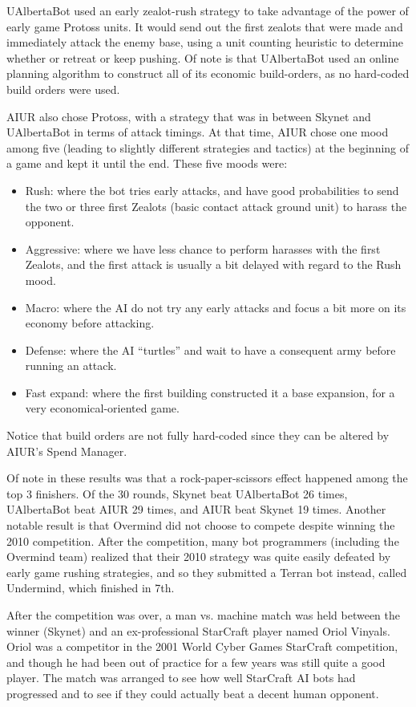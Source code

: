 \documentclass[journal]{IEEEtran}
\begin{document}
UAlbertaBot used an early zealot-rush strategy to take advantage of the power of early game Protoss units. 
It would send out the first zealots that were made and immediately attack the enemy base, using a unit
counting heuristic to determine whether or retreat or keep pushing. Of note is that UAlbertaBot used an
online planning algorithm to construct all of its economic build-orders\cite{churchill2011build}, as no hard-coded build orders
were used. 

AIUR also chose  Protoss, with a strategy that was in between Skynet
and UAlbertaBot in terms of  attack timings.  At that time, AIUR chose
one  mood among  five (leading  to slightly  different  strategies and
tactics) at the  beginning of a game and kept it  until the end. These
five moods were:
\begin{itemize}
\item  Rush:  where  the  bot  tries  early  attacks,  and  have  good
  probabilities to send the two or three first Zealots (basic contact attack ground unit) to harass the
  opponent.
\item Aggressive: where  we have less chance to  perform harasses with
  the first Zealots, and the first attack is usually a bit delayed
  with regard to the Rush mood.
\item Macro: where the AI do not try any early attacks and focus a bit
  more on its economy before attacking.
\item Defense: where the AI  ``turtles'' and wait to have a consequent
  army before running an attack.
\item  Fast expand:  where the  first building  constructed it  a base
  expansion, for a very economical-oriented game.
\end{itemize}
Notice that  build orders are not  fully hard-coded since  they can be
altered by AIUR's Spend Manager.

Of  note  in  these  results  was that  a  rock-paper-scissors  effect
happened among  the top  3 finishers.  Of  the 30 rounds,  Skynet beat
UAlbertaBot 26  times, UAlbertaBot beat  AIUR 29 times, and  AIUR beat
Skynet  19 times.   Another notable  result is  that Overmind  did not
choose  to compete despite  winning the  2010 competition.   After the
competition,  many  bot  programmers  (including  the  Overmind  team)
realized that their  2010 strategy was quite easily  defeated by early
game rushing strategies,  and so they submitted a  Terran bot instead,
called Undermind, which finished in 7th.

After the competition was over, a man vs. machine match was held between the winner (Skynet) and an
ex-professional StarCraft player named Oriol Vinyals. Oriol was a competitor in the 2001 World Cyber
Games StarCraft competition, and though he had been out of practice for a few years was still quite a
good player. The match was arranged to see how well StarCraft AI bots had progressed and to see if
they could actually beat a decent human opponent. 
\end{document}
